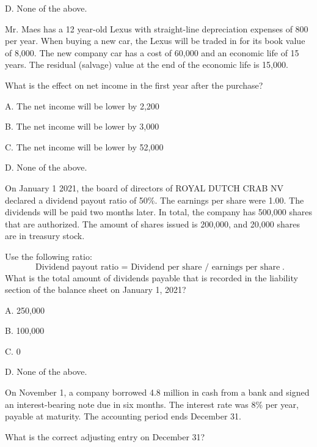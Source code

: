 \documentclass{scrartcl}
\begin{document}
D. None of the above.

\vspace{10em}

Mr. Maes has a 12 year-old Lexus with straight-line depreciation expenses
of 800 per year. 
When buying a new car, the Lexus will be traded in for its book value of
8,000. 
The new company car has a cost of 60,000 and an economic life of 15 years.
The residual (salvage) value at the end of the economic life is 15,000.

What is the effect on net income in the first year after the purchase?

\bigskip

A. The net income will be lower by 2,200

B. The net income will be lower by 3,000

C. The net income will be lower by 52,000

D. None of the above.

\vspace{10em}

On January 1 2021, the board of directors of ROYAL DUTCH CRAB NV 
declared a dividend payout ratio of 50\%.
The earnings per share were 1.00. 
The dividends will be paid two months later.
In total, the company has 500,000 shares that are authorized.
The amount of shares issued is 200,000,
and 20,000 shares are in treasury stock.

\bigskip

Use the following ratio:
\[
\text{Dividend payout ratio~$=$~Dividend per share~/~earnings per share} 
.\] 
What is the total amount of dividends payable
that is recorded in the liability section of the balance sheet
on January 1, 2021?

\bigskip

A. 250,000

B. 100,000

C. 0

D. None of the above.

\vspace{10em}

On November 1, a company borrowed 4.8 million in cash from a bank 
and signed an interest-bearing note due in six months.
The interest rate was 8\% per year, payable at maturity.
The accounting period ends December 31.

\bigskip

What is the correct adjusting entry on December 31?
\end{document}
